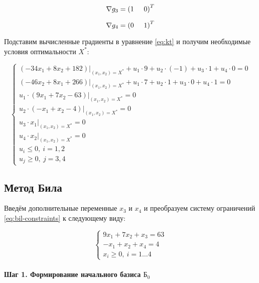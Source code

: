 \begin{equation*}
	\nabla g_3 = \left( 1 \hspace{5mm} 0 \right)^T
\end{equation*}

\begin{equation*}
	\nabla g_4 = \left( 0 \hspace{5mm} 1 \right)^T
\end{equation*}

Подставим вычисленные градиенты в уравнение \ref{eq:kt} и получим необходимые условия оптимальности $X^*$:

\begin{equation*}
	\begin{cases}
		\left( -34 x_1 + 8 x_2 + 182 \right) \Big|_{(x_1, x_2) = X^*} + u_1 \cdot 9 + u_2 \cdot (-1) + u_3 \cdot 1 + u_4 \cdot 0 = 0
		\\
		\left( -46 x_2 + 8 x_1 + 266 \right) \Big|_{(x_1, x_2) = X^*} + u_1 \cdot 7 + u_2 \cdot 1 + u_3 \cdot 0 + u_4 \cdot 1 = 0
		\\
		u_1 \cdot (9 x_1 + 7 x_2 - 63) \Big|_{(x_1, x_2) = X^*} = 0
		\\
		u_2 \cdot (-x_1 + x_2 - 4) \Big|_{(x_1, x_2) = X^*} = 0
		\\
		u_3 \cdot x_1 \Big|_{(x_1, x_2) = X^*} = 0
		\\
		u_4 \cdot x_2 \Big|_{(x_1, x_2) = X^*} = 0
		\\
		u_i \leq 0,\ i = 1,2
		\\
		u_j \geq 0,\ j = 3,4
	\end{cases}
\end{equation*}

\subsection{Метод Била}

Введём дополнительные переменные $x_3$ и $x_4$ и преобразуем систему ограничений \ref{eq:bil-constraints} к следующему виду:

\begin{equation*}
\begin{cases}
	9 x_1 + 7 x_2 + x_3 = 63
	\\
	- x_1 + x_2 + x_4 = 4
	\\
	x_i \geq 0,\ i = 1 \dots 4
\end{cases}
\end{equation*}

\paragraph{Шаг 1. Формирование начального базиса $\text{Б}_0$}

